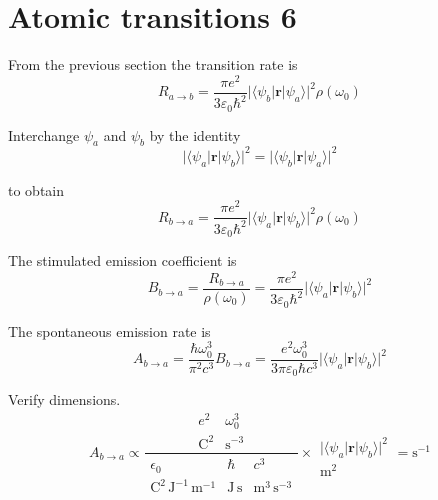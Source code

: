 

\section*{Atomic transitions 6}

From the previous section the transition rate is
\begin{equation*}
R_{a\rightarrow b}
=\frac{\pi e^2}{3\varepsilon_0\hbar^2}
\bigl|\langle\psi_b|\mathbf r|\psi_a\rangle\bigr|^2\rho(\omega_0)
\end{equation*}

Interchange $\psi_a$ and $\psi_b$ by the identity
\begin{equation*}
\bigl|\langle\psi_a|\mathbf r|\psi_b\rangle\bigr|^2
=\bigl|\langle\psi_b|\mathbf r|\psi_a\rangle\bigr|^2
\end{equation*}

to obtain
\begin{equation*}
R_{b\rightarrow a}
=\frac{\pi e^2}{3\varepsilon_0\hbar^2}
\bigl|\langle\psi_a|\mathbf r|\psi_b\rangle\bigr|^2\rho(\omega_0)
\end{equation*}

The stimulated emission coefficient is
\begin{equation*}
B_{b\rightarrow a}=\frac{R_{b\rightarrow a}}{\rho(\omega_0)}
=\frac{\pi e^2}{3\varepsilon_0\hbar^2}
\bigl|\langle\psi_a|\mathbf r|\psi_b\rangle\bigr|^2
\end{equation*}

The spontaneous emission rate is
\begin{equation*}
A_{b\rightarrow a}=\frac{\hbar\omega_0^3}{\pi^2c^3}B_{b\rightarrow a}
=\frac{e^2\omega_0^3}{3\pi\varepsilon_0\hbar c^3}
\bigl|\langle\psi_a|\mathbf r|\psi_b\rangle\bigr|^2
\tag{1}
\end{equation*}

Verify dimensions.
\begin{equation*}
A_{b\rightarrow a}\propto
\frac{
\begin{matrix}
e^2 & \omega_0^3
\\
\text{C}^2 & \text{s}^{-3}
\end{matrix}
}
{
\begin{matrix}
\epsilon_0 & \hbar & c^3
\\
\text{C}^2\,\text{J}^{-1}\,\text{m}^{-1}
& \text{J}\,\text{s}
& \text{m}^3\,\text{s}^{-3}
\end{matrix}
}
\times
\begin{matrix}
\\
\bigl|\langle\psi_a|\mathbf r|\psi_b\rangle\bigr|^2
\\
\text{m}^2
\end{matrix}
=\text{s}^{-1}
\end{equation*}

